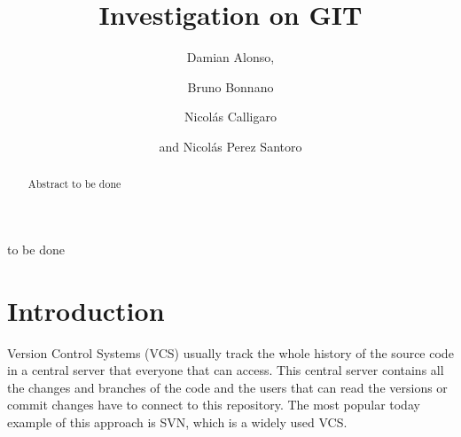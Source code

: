 \documentclass[%
	final,
	notitlepage,
	narroweqnarray,
	inline,
	twoside,
	]{ieee}
\begin{document}
\title[Investigation on GIT]{%
       Investigation on GIT}

\author[GRUPOAPIT]{Damian Alonso,%
\and{} Bruno Bonnano
\and{} Nicol\'{a}s Calligaro
\and{}and Nicol\'{a}s Perez Santoro
}



\maketitle               

\begin{abstract} 
Abstract to be done
\end{abstract}

\begin{keywords}
to be done
\end{keywords}

\section{Introduction}


\PARstart Version Control Systems (VCS) usually track the whole history of the
source code in a central server that everyone that can access. This 
central server contains all the changes and branches of the code and 
the users that can read the versions or commit changes have to connect 
to this repository. The most popular today example of this approach is SVN, which is a 
widely used VCS.
\end{document}
